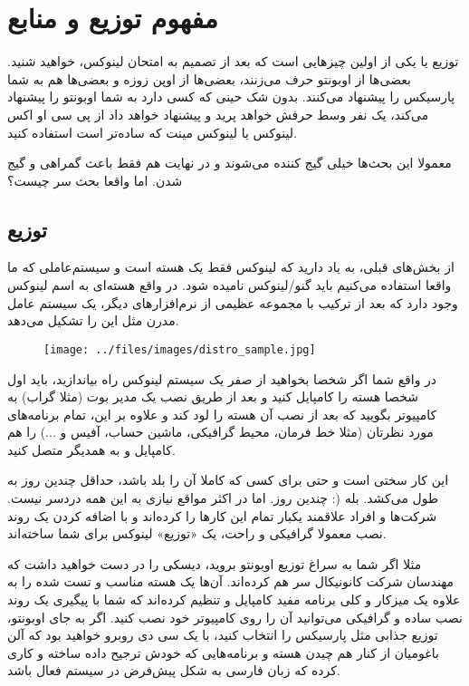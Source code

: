 \section{مفهوم توزیع و منابع}

توزیع یا 
یکی از اولین چیزهایی است که بعد از تصمیم به امتحان لینوکس، خواهید شنید. بعضی‌ها از اوبونتو حرف می‌زنند، بعضی‌ها از اوپن زوزه و بعضی‌ها هم به شما پارسیکس را پیشنهاد می‌کنند. بدون شک حینی که کسی دارد به شما اوبونتو را پیشنهاد می‌کند، یک نفر وسط حرفش خواهد پرید و پیشنهاد خواهد داد از پی سی او اکس لینوکس یا لینوکس مینت که ساده‌تر است استفاده کنید.

معمولا این بحث‌ها خیلی گیج کننده می‌شوند و در نهایت هم فقط باعث گمراهی و گیج شدن. اما واقعا بحث سر چیست؟
\subsection*{توزیع}
از بخش‌های قبلی، به یاد دارید که لینوکس فقط یک هسته است و سیستم‌عاملی که ما واقعا استفاده می‌کنیم باید گنو/لینوکس نامیده شود. در واقع هسته‌ای به اسم لینوکس وجود دارد که بعد از ترکیب با مجموعه عظیمی از نرم‌افزارهای دیگر، یک سیستم عامل مدرن مثل این را تشکیل می‌دهد.
\begin{figure}[h]
	\texttt{[image: ../files/images/distro\_sample.jpg]}
\end{figure}
در واقع شما اگر شخصا بخواهید از صفر یک سیستم لینوکس راه بیاندازید، باید اول شخصا هسته را کامپایل کنید و بعد از طریق نصب یک مدیر بوت (مثلا گراب) به کامپیوتر بگویید که بعد از نصب آن هسته را لود کند و علاوه بر این، تمام برنامه‌های مورد نظرتان (مثلا خط فرمان، محیط گرافیکی، ماشین حساب، آفیس و ...) را هم کامپایل و به همدیگر متصل کنید.

این کار سختی است و حتی برای کسی که کاملا آن را بلد باشد، حداقل چندین روز به طول می‌کشد. بله (: چندین روز. اما در اکثر مواقع نیازی به این همه دردسر نیست. شرکت‌ها و افراد علاقمند یکبار تمام این کارها را کرده‌اند و با اضافه کردن یک روند نصب معمولا گرافیکی و راحت، یک «توزیع» لینوکس برای شما ساخته‌اند.

مثلا اگر شما به سراغ توزیع اوبونتو بروید، دیسکی را در دست خواهید داشت که مهندسان شرکت کانونیکال سر هم کرده‌اند. آن‌ها یک هسته مناسب و تست شده را به علاوه یک میزکار و کلی برنامه مفید کامپایل و تنظیم کرده‌اند که شما با پیگیری یک روند نصب ساده و گرافیکی می‌توانید آن را روی کامپیوتر خود نصب کنید.
اگر به جای اوبونتو، توزیع جذابی مثل پارسیکس را انتخاب کنید، با یک سی دی روبرو خواهید بود که آلن باغومیان از کنار هم چیدن هسته و برنامه‌هایی که خودش ترجیح داده ساخته و کاری کرده که زبان فارسی به شکل پیش‌فرض در سیستم فعال باشد.

